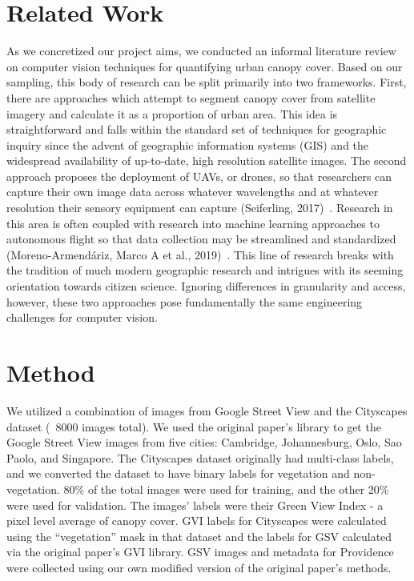\section{Related Work}
As we concretized our project aims, we conducted an informal literature review on computer vision techniques for quantifying urban canopy cover. Based on our sampling, this body of research can be split primarily into two frameworks. First, there are approaches which attempt to segment canopy cover from satellite imagery and calculate it as a proportion of urban area. This idea is straightforward and falls within the standard set of techniques for geographic inquiry since the advent of geographic information systems (GIS) and the widespread availability of up-to-date, high resolution satellite images. The second approach proposes the deployment of UAVs, or drones, so that researchers can capture their own image data across whatever wavelengths and at whatever resolution their sensory equipment can capture (Seiferling, 2017)~\cite{Seiferling}. Research in this area is often coupled with research into machine learning approaches to autonomous flight so that data collection may be streamlined and standardized (Moreno-Armendáriz, Marco A et al., 2019)~\cite{Moreno}. This line of research breaks with the tradition of much modern geographic research and intrigues with its seeming orientation towards citizen science. Ignoring differences in granularity and access, however, these two approaches pose fundamentally the same engineering challenges for computer vision.


\section{Method}

We utilized a combination of images from Google Street View and the Cityscapes dataset (~8000 images total). We used the original paper’s library to get the Google Street View images from five cities: Cambridge, Johannesburg, Oslo, Sao Paolo, and Singapore. The Cityscapes dataset originally had multi-class labels, and we converted the dataset to have binary labels for vegetation and non-vegetation. 80\% of the total images were used for training, and the other 20\% were used for validation. The images’ labels were their Green View Index - a pixel level average of canopy cover. GVI labels for Cityscapes were calculated using the “vegetation” mask in that dataset and the labels for GSV calculated via the original paper’s GVI library. GSV images and metadata for Providence were collected using our own modified version of the original paper's methods.



